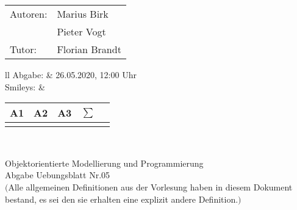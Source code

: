 \documentclass[12pt,a4paper,oneside,ngerman]{article}
\newcommand{\fach}{Objektorientierte Modellierung und Programmierung}
\newcommand{\dokumentenTitel}{Abgabe Uebungsblatt Nr.05}
\newcommand{\Abgabe}{26.05.2020, 12:00 Uhr}
\newcommand{\memberOne}{Marius Birk}
\newcommand{\memberTwo}{Pieter Vogt}
\newcommand{\tutor}{ Florian Brandt }
\begin{document}
	\thispagestyle{plain} %
	
	\begin{multicols}{2} %
		\hspace{-1cm} %
		\begin{tabular}{ll} %
			Autoren: & \memberOne \\ %
			& \memberTwo \\
			Tutor: & \tutor \\  
		\end{tabular}
		
		\columnbreak %
		\hspace{-1cm} %
		\begin{tabular}{ll} %
			Abgabe: & \Abgabe \\ %
			Smileys: &  
			\renewcommand{\arraystretch}{1.2} 
			\begin{tabular}{|p{0.8cm}|p{0.8cm}|p{0.8cm}|p{0.8cm}|p{0.8cm}|}
				\hline A1 & A2 & A3 &$\sum\limits^{ }$ \\ \hline
				& & & \\ \hline    
			\end{tabular} \\
		\end{tabular}
		
	\end{multicols} %
	
	\begin{center}
		\Large{\fach} \\
		\LARGE{\dokumentenTitel} \\
		\small
		$($Alle allgemeinen Definitionen aus der Vorlesung haben in diesem Dokument bestand, es sei den sie erhalten eine explizit andere Definition.$)$
	\end{center}
\end{document}

